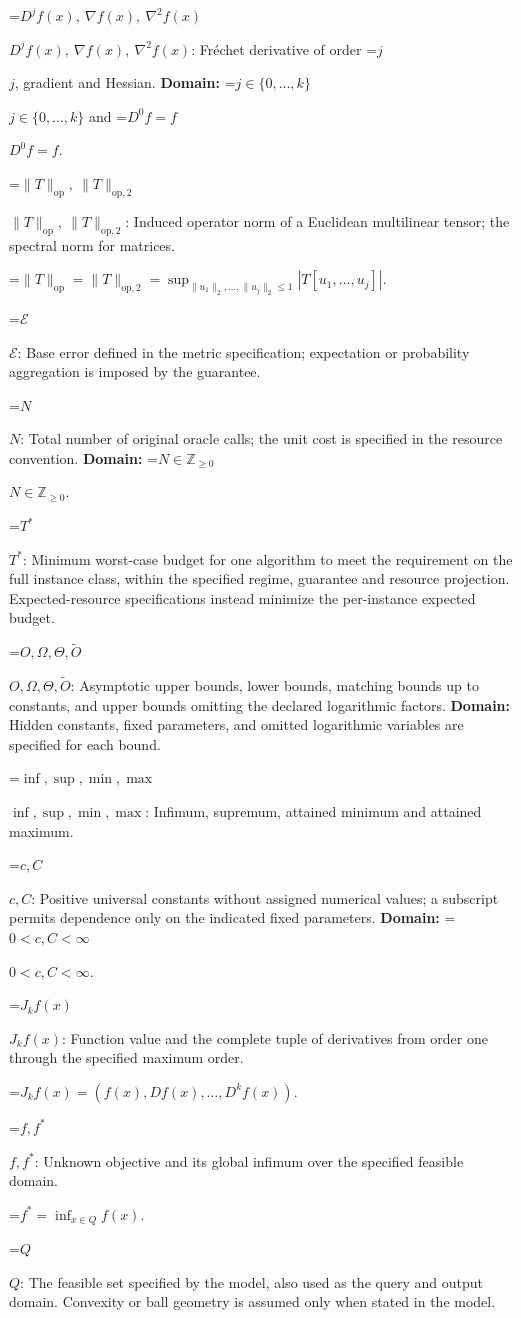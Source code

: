 \documentclass[10pt,a4paper]{article}
\newcommand{\AtlasMath}[1]{\par\begingroup\centering\setbox0=\hbox{$\displaystyle #1$}\ifdim\wd0>1.4\linewidth\typeout{ATLAS WIDE FORMULA: \the\wd0}\fi\ifdim\wd0>\linewidth\resizebox{\linewidth}{!}{\box0}\else\box0\fi\par\endgroup}
\newcommand{\AtlasInlineMath}[1]{\begingroup\setbox0=\hbox{$#1$}\ifdim\wd0>.4\linewidth\endgroup\AtlasMath{#1}\else\endgroup$#1$\fi}
\begin{document}
\AtlasInlineMath{D^jf(x),\ \nabla f(x),\ \nabla^2f(x)}: Fréchet derivative of order \AtlasInlineMath{j}, gradient and Hessian. \textbf{Domain:} \AtlasInlineMath{j\in\{0,\ldots,k\}} and \AtlasInlineMath{D^0f=f}.

\AtlasInlineMath{\|T\|_{\mathrm{op}},\ \|T\|_{\mathrm{op},2}}: Induced operator norm of a Euclidean multilinear tensor; the spectral norm for matrices.


\AtlasMath{\|T\|_{\mathrm{op}}=\|T\|_{\mathrm{op},2}=\sup_{\|u_1\|_2,\ldots,\|u_j\|_2\le1}|T[u_1,\ldots,u_j]|.}


\AtlasInlineMath{\mathcal{E}}: Base error defined in the metric specification; expectation or probability aggregation is imposed by the guarantee.

\AtlasInlineMath{N}: Total number of original oracle calls; the unit cost is specified in the resource convention. \textbf{Domain:} \AtlasInlineMath{N\in\mathbb{Z}_{\ge0}}.

\AtlasInlineMath{T^*}: Minimum worst-case budget for one algorithm to meet the requirement on the full instance class, within the specified regime, guarantee and resource projection. Expected-resource specifications instead minimize the per-instance expected budget.

\AtlasInlineMath{O,\Omega,\Theta,\widetilde{O}}: Asymptotic upper bounds, lower bounds, matching bounds up to constants, and upper bounds omitting the declared logarithmic factors. \textbf{Domain:} Hidden constants, fixed parameters, and omitted logarithmic variables are specified for each bound.

\AtlasInlineMath{\inf,\sup,\min,\max}: Infimum, supremum, attained minimum and attained maximum.

\AtlasInlineMath{c,C}: Positive universal constants without assigned numerical values; a subscript permits dependence only on the indicated fixed parameters. \textbf{Domain:} \AtlasInlineMath{0<c,C<\infty}.

\AtlasInlineMath{J_{k}f(x)}: Function value and the complete tuple of derivatives from order one through the specified maximum order.


\AtlasMath{J_{k}f(x)=(f(x),Df(x),\ldots,D^{k}f(x)).}


\AtlasInlineMath{f,f^*}: Unknown objective and its global infimum over the specified feasible domain.


\AtlasMath{f^*=\inf_{x\in Q}f(x).}


\AtlasInlineMath{Q}: The feasible set specified by the model, also used as the query and output domain. Convexity or ball geometry is assumed only when stated in the model.
\end{document}
